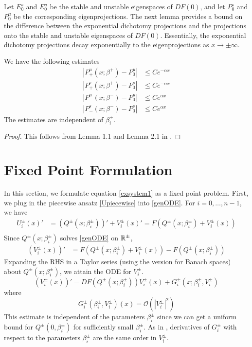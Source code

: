 \documentclass[thesis.tex]{subfiles}
\begin{document}
Let $E_0^s$ and $E_0^u$ be the stable and unstable eigenspaces of $DF(0)$, and let $P_0^s$ and $P_0^u$ be the corresponding eigenprojections. The next lemma provides a bound on the difference between the exponential dichotomy projections and the projections onto the stable and unstable eigenspaces of $DF(0)$. Essentially, the exponential dichotomy projections decay exponentially to the eigenprojections as $x \rightarrow \pm \infty$.


\begin{lemma}\label{projdifflemma}
We have the following estimates
\begin{equation}\label{projdiffest}
\begin{aligned}
|P^u_+(x; \beta^+) - P_0^u| &\leq C e^{-\alpha x} \\
|P^s_+(x; \beta^+) - P_0^s| &\leq C e^{-\alpha x} \\
|P^u_-(x; \beta^-) - P_0^u| &\leq C e^{\alpha x} \\
|P^s_-(x; \beta^-) - P_0^s| &\leq C e^{\alpha x} 
\end{aligned}
\end{equation}
The estimates are independent of $\beta_i^\pm$.
\begin{proof}
This follows from Lemma 1.1 and Lemma 2.1 in \cite{Sandstede1993}.
\end{proof}
\end{lemma}

\section{Fixed Point Formulation}

In this section, we formulate equation \eqref{exsystem1} as a fixed point problem. First, we plug in the piecewise ansatz \eqref{Upiecewise} into \eqref{genODE}. For $i = 0, \dots, n-1$, we have 
\begin{align*}
U_i^\pm(x)' &= (Q^\pm(x; \beta_i^\pm))' + V_i^\pm(x)' = F\left(Q^\pm(x; \beta_i^\pm) + V_i^\pm(x) \right) \\
\end{align*}
Since $Q^\pm(x; \beta_i^\pm)$ solves \eqref{genODE} on $\mathbb{R}^\pm$, 
\begin{align*}
(V_i^\pm(x))' &= F\left(Q^\pm(x; \beta_i^\pm) + V_i^\pm(x) \right) - F(Q^\pm(x; \beta_i^\pm))
\end{align*}
Expanding the RHS in a Taylor series (using the version for Banach spaces) about $Q^\pm(x; \beta_i^\pm)$, we attain the ODE for $V_i^\pm$.
\begin{equation}\label{Vpiecewise}
(V_i^\pm(x))' = DF(Q^\pm(x; \beta_i^\pm)) V_i^\pm(x) + G_i^\pm(x; \beta_i^\pm, V_i^\pm)
\end{equation}
where 
\begin{equation}\label{Gquadratic}
G_i^\pm(\beta_i^\pm, V_i^\pm)(x) = \mathcal{O}(|V_i^\pm|^2)
\end{equation}
This estimate is independent of the parameters $\beta_i^\pm$ since we can get a uniform bound for $Q^\pm(0, \beta_i^\pm)$ for sufficiently small $\beta_i^\pm$. As in \cite{Sandstede1997}, derivatives of $G_i^\pm$ with respect to the parameters $\beta_i^\pm$ are the same order in $V_i^\pm$.
\end{document}

